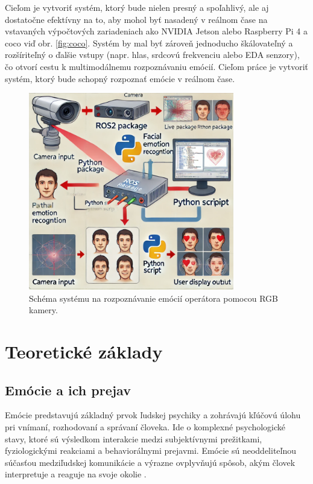 Cieľom je vytvoriť systém, ktorý bude nielen presný a spoľahlivý, ale aj dostatočne efektívny na to, aby mohol byť nasadený v reálnom čase na vstavaných výpočtových zariadeniach ako 
NVIDIA Jetson alebo Raspberry Pi 4 a \gls{coco} viď obr. \ref{fig:coco}. Systém by mal byť zároveň jednoducho škálovateľný a rozšíriteľný o ďalšie vstupy (napr. hlas, srdcovú frekvenciu alebo EDA senzory), čo otvorí cestu k multimodálnemu rozpoznávaniu emócií.
Cieľom práce je vytvoriť systém, ktorý bude schopný rozpoznať emócie v reálnom čase.\
\begin{figure}[!htpb]
    \centering
    \includegraphics[width=0.8\textwidth]{img/connection.png}
    \caption{Schéma systému na rozpoznávanie emócií operátora pomocou RGB kamery.} 
    \label{fig:schema}
\end{figure}
\section{Teoretické základy}
\label{sec:theory}
\subsection{Emócie a ich prejav}
\label{sec:emotions}
Emócie predstavujú základný prvok ľudskej psychiky a zohrávajú kľúčovú úlohu pri vnímaní, rozhodovaní a správaní človeka. Ide o komplexné psychologické stavy, ktoré sú výsledkom interakcie medzi subjektívnymi prežitkami, 
fyziologickými reakciami a behaviorálnymi prejavmi. 
Emócie sú neoddeliteľnou súčasťou medziľudskej komunikácie a výrazne ovplyvňujú spôsob, akým človek interpretuje a reaguje na svoje okolie \cite{article01}.

